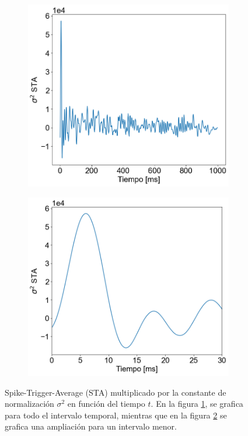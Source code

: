 \documentclass[aps,prb,twocolumn,superscriptaddress,floatfix,longbibliography]{revtex4-2}
\newcounter{para}
\begin{document}
\begin{figure}[h]
  \centering
  \begin{subfigure}[b]{0.35\textwidth}
      \centering
      \includegraphics[width=\textwidth]{STA_total.png}
      \caption{\label{fig:STA_total}}
      \end{subfigure}
  \hfill
  \begin{subfigure}[b]{0.35\textwidth}
      \centering
      \includegraphics[width=\textwidth]{STA_parcial.png}
      \caption{\label{fig:STA_parcial}}
  \end{subfigure}
     \caption{Spike-Trigger-Average (STA) multiplicado por la constante de normalización $\sigma^2$ en función del tiempo $t$. En la figura \ref{fig:STA_total}, se grafica para todo el intervalo temporal, mientras que en la figura \ref{fig:STA_parcial} se grafica una ampliación para un intervalo menor.}
     \label{fig:STA}
\end{figure}
\end{document}
